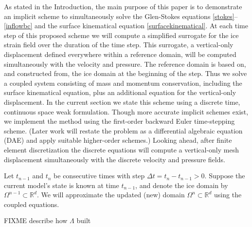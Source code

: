 \documentclass[letterpaper,final,12pt,reqno]{amsart}
\newcommand{\RR}{\mathbb{R}}
\begin{document}
As stated in the Introduction, the main purpose of this paper is to demonstrate an implicit scheme to simultaneously solve the Glen-Stokes equations \eqref{stokes}--\eqref{inflowbc} and the surface kinematical equation \eqref{surfacekinematical}.  At each time step of this proposed scheme we will compute a simplified surrogate for the ice strain field over the duration of the time step.  This surrogate, a vertical-only displacement defined everywhere within a reference domain, will be computed simultaneously with the velocity and pressure.  The reference domain is based on, and constructed from, the ice domain at the beginning of the step.  Thus we solve a coupled system consisting of mass and momentum conservation, including the surface kinematical equation, plus an additional equation for the vertical-only displacement.  In the current section we state this scheme using a discrete time, continuous space weak formulation.  Though more accurate implicit schemes exist, we implement the method using the first-order backward Euler time-stepping scheme.  (Later work will restate the problem as a differential algebraic equation (DAE) and apply suitable higher-order schemes.)  Looking ahead, after finite element discretization the discrete equations will compute a vertical-only mesh displacement simultaneously with the discrete velocity and pressure fields.


Let $t_{n-1}$ and $t_n$ be consecutive times with step $\Delta t = t_n - t_{n-1} > 0$.  Suppose the current model's state is known at time $t_{n-1}$, and denote the ice domain by $\Omega^{n-1} \subset \RR^d$.  We will approximate the updated (new) domain $\Omega^n \subset \RR^d$ using the coupled equations.

FIXME describe how $\Lambda$ built
\end{document}
